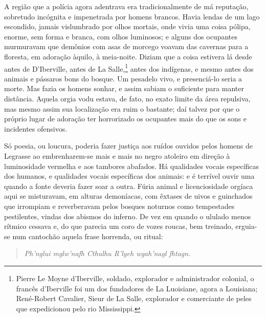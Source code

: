 A região que a polícia agora adentrava era tradicionalmente de má
reputação, sobretudo incógnita e impenetrada por homens brancos. Havia
lendas de um lago escondido, jamais vislumbrado por olhos mortais, onde
vivia uma coisa pólipa, enorme, sem forma e branca, com olhos luminosos;
e alguns dos ocupantes murmuravam que demônios com asas de morcego
voavam das cavernas para a floresta, em adoração àquilo, à meia-noite.
Diziam que a coisa estivera lá desde antes de D'Iberville, antes de La
Salle,\footnote{Pierre Le Moyne d'Iberville, soldado,
  explorador e administrador colonial, o francês d'Iberville foi um dos
  fundadores de La Luoisiane, agora a Louisiana; René-Robert Cavalier,
  Sieur de La Salle, explorador e comerciante de peles que
  expedicionou pelo rio Mississippi.} antes dos indígenas, e mesmo antes
dos animais e pássaros bons do bosque. Um pesadelo vivo, e presenciá-lo
seria a morte. Mas fazia os homens sonhar, e assim sabiam o suficiente
para manter distância. Aquela orgia vodu estava, de fato, no exato
limite da área repulsiva, mas mesmo assim sua localização era ruim o
bastante; daí talvez por que o próprio lugar de adoração ter
horrorizado os ocupantes mais do que os sons e incidentes ofensivos.

Só poesia, ou loucura, poderia fazer justiça aos ruídos ouvidos pelos
homens de Legrasse ao embrenharem-se mais e mais no negro atoleiro em
direção à luminosidade vermelha e aos tambores abafados. Há qualidades
vocais específicas dos humanos, e qualidades vocais específicas dos
animais: e é terrível ouvir uma quando a fonte deveria fazer soar a
outra. Fúria animal e licenciosidade orgíaca aqui se misturavam, em
alturas demoníacas, com êxtases de uivos e guinchados que irrompiam e
reverberavam pelos bosques noturnos como tempestades pestilentes, vindas
dos abismos do inferno. De vez em quando o ululado menos rítmico cessava
e, do que parecia um coro de vozes roucas, bem treinado, erguia-se num
cantochão aquela frase horrenda, ou ritual:

\begin{verse}
\emph{Ph'nglui mglw'nafh Cthulhu R'lyeh wgah'nagl fhtagn.}
\end{verse}

